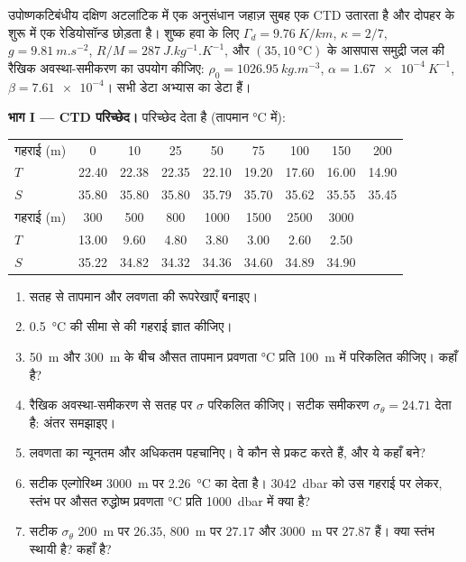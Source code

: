 \begin{problem}
\label{pb:b1:fluid-envelopes-structure:1}
उपोष्णकटिबंधीय दक्षिण अटलांटिक में एक अनुसंधान जहाज़ सुबह एक CTD उतारता है और दोपहर के शुरू में एक रेडियोसॉन्ड छोड़ता है। शुष्क हवा के लिए $\Gamma_d =
\qty{9.76}{K/km}$, $\kappa = 2/7$, $g = \qty{9.81}{m.s^{-2}}$, $R/M =
\qty{287}{J.kg^{-1}.K^{-1}}$, और $(35, \qty{10}{\celsius})$ के आसपास समुद्री जल की रैखिक अवस्था-समीकरण का उपयोग कीजिए: $\rho_0 = \qty{1026.95}{kg.m^{-3}}$, $\alpha = \qty{1.67e-4}{K^{-1}}$, $\beta = \num{7.61e-4}$। सभी डेटा अभ्यास का डेटा हैं।

\medskip
\noindent\textbf{भाग I --- CTD परिच्छेद।} परिच्छेद देता है (तापमान \si{\celsius} में):
\begin{center}
\small
\setlength{\tabcolsep}{3pt}
\begin{tabular}{|l|*{8}{c}|}
\hline
गहराई (m) & 0 & 10 & 25 & 50 & 75 & 100 & 150 & 200 \\
$T$ & 22.40 & 22.38 & 22.35 & 22.10 & 19.20 & 17.60 & 16.00 & 14.90 \\
$S$ & 35.80 & 35.80 & 35.80 & 35.79 & 35.70 & 35.62 & 35.55 & 35.45 \\
\hline
गहराई (m) & 300 & 500 & 800 & 1000 & 1500 & 2500 & 3000 & \\
$T$ & 13.00 & 9.60 & 4.80 & 3.80 & 3.00 & 2.60 & 2.50 & \\
$S$ & 35.22 & 34.82 & 34.32 & 34.36 & 34.60 & 34.89 & 34.90 & \\
\hline
\end{tabular}
\end{center}
\begin{enumerate}
  \item सतह से तापमान और लवणता की रूपरेखाएँ बनाइए।
  \item \qty{0.5}{\celsius} की सीमा से  की गहराई ज्ञात कीजिए।
  \item \qty{50}{m} और \qty{300}{m} के बीच औसत तापमान प्रवणता \si{\celsius} प्रति \qty{100}{m} में परिकलित कीजिए।  कहाँ है?
  \item रैखिक अवस्था-समीकरण से सतह पर $\sigma$ परिकलित कीजिए। सटीक समीकरण $\sigma_\theta = 24.71$ देता है: अंतर समझाइए।
  \item लवणता का न्यूनतम और अधिकतम पहचानिए। वे कौन से  प्रकट करते हैं, और ये कहाँ बने?
  \item सटीक एल्गोरिथ्म \qty{3000}{m} पर \qty{2.26}{\celsius} का  देता है। \qty{3042}{dbar} को उस गहराई पर लेकर, स्तंभ पर औसत रुद्धोष्म प्रवणता \si{\celsius} प्रति \qty{1000}{dbar} में क्या है?
  \item सटीक $\sigma_\theta$ \qty{200}{m} पर $26.35$, \qty{800}{m} पर $27.17$ और \qty{3000}{m} पर $27.87$ हैं। क्या स्तंभ स्थायी है?  कहाँ है?
\end{enumerate}


\end{problem}
